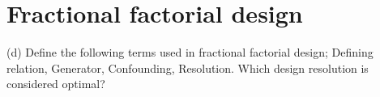 

\section{Fractional factorial design}

(d)	Define the following terms used in fractional factorial design; Defining relation,
Generator, Confounding, Resolution. Which design resolution is considered
optimal?




